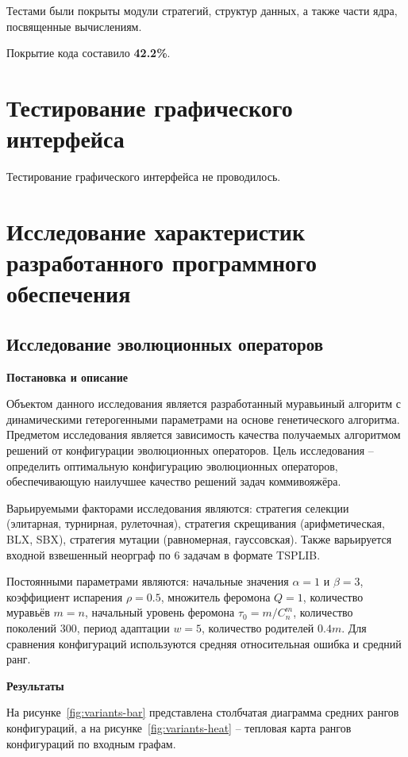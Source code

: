 Тестами были покрыты модули стратегий, структур данных, а также части ядра, посвященные вычислениям.

Покрытие кода составило \textbf{42.2\%}.

\section{Тестирование графического интерфейса}

Тестирование графического интерфейса не проводилось.

\section{Исследование характеристик разработанного программного обеспечения}

\subsection{Исследование эволюционных операторов}

\textbf{Постановка и описание}

Объектом данного исследования является разработанный муравьиный алгоритм с динамическими гетерогенными параметрами на основе генетического алгоритма. Предметом исследования является зависимость качества получаемых алгоритмом решений от конфигурации эволюционных операторов. Цель исследования – определить оптимальную конфигурацию эволюционных операторов, обеспечивающую наилучшее качество решений задач коммивояжёра.

Варьируемыми факторами исследования являются: стратегия селекции (элитарная, турнирная, рулеточная), стратегия скрещивания (арифметическая, BLX, SBX), стратегия мутации (равномерная, гауссовская). Также варьируется входной взвешенный неорграф по 6 задачам в формате TSPLIB. 

Постоянными параметрами являются: начальные значения $\alpha=1$ и $\beta=3$, коэффициент испарения $\rho=0.5$, множитель феромона $Q=1$, количество муравьёв $m=n$, начальный уровень феромона $\tau_0 = m / C_n^m$, количество поколений 300, период адаптации $w=5$, количество родителей $0.4m$. Для сравнения конфигураций используются средняя относительная ошибка и средний ранг.

\textbf{Результаты}

На рисунке~\ref{fig:variants-bar} представлена столбчатая диаграмма средних рангов конфигураций, а на рисунке~\ref{fig:variants-heat} -- тепловая карта рангов конфигураций по входным графам.

